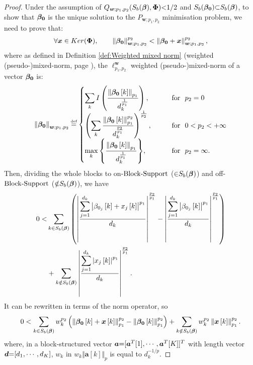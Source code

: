 \begin{proof}
Under the assumption of $Q_{\boldsymbol{w};p_1,p_2}(S_b(\boldsymbol{\beta}),\boldsymbol{\Phi}) {<} 1/2$ and $S_b(\boldsymbol{\beta_0}) {\subset} S_b(\boldsymbol{\beta})$, to show that $\boldsymbol{\beta_0}$ is the unique solution to the $P_{\boldsymbol{w};p_1,p_2}$ minimisation problem, we need to prove that:
\begin{equation*}
\forall \boldsymbol{x} \in Ker(\boldsymbol{\Phi}), \qquad \left\lVert\boldsymbol{\beta_0}\right\rVert_{\boldsymbol{w};p_1,p_2}^{p_2} <
\left\lVert\boldsymbol{\beta_0}+\boldsymbol{x}\right\rVert_{\boldsymbol{w};p_1,p_2}^{p_2},
\end{equation*}
where as defined in Definition \ref{def:Weighted mixed norm} (weighted (pseudo-)mixed-norm, page \pageref{def:Weighted mixed norm}), the $\ell_{p_1,p_2}^{\boldsymbol{w}}$ weighted (pseudo-)mixed-norm of a vector $\boldsymbol{\beta_0}$ is:
 \begin{equation*}
\mynorm{\mybetaz}_{\boldsymbol{w};p_1,p_2} \myeq 
\begin{cases}
    \displaystyle\sum_{k}^{} I \myparanthese{\frac{\mynorm{\mybetaz \mybracket{k}}_{p_1}}{d_k^{\frac{1}{p_1}}}}, & \qquad \text{for \ }p_2= 0\\
    \myparanthese{\displaystyle\sum_{k}^{} \frac{\mynorm{\mybetaz \mybracket{k}}_{p_1}^ {p_2}}{d_k^{\frac{p_2}{p_1}}}} ^ {\frac{1}{p_2}},  & \qquad  \text{for \ } 0 < p_2 < +\infty\\
    \displaystyle\max_{k}{\mybrace{\frac{\mynorm{\mybetaz \mybracket{k}}_{p_1}}{d_k^{\frac{1}{p_1}}}}}, & \qquad \text{for \ } p_2= \infty.
  \end{cases}
\end{equation*}
Then, dividing the whole blocks to on-$\mathrm{Block\text{{-}}Support}$ (${\in} S_b(\boldsymbol{\beta})$) and off-$\mathrm{Block\text{{-}}Support}$ (${\notin} S_b(\boldsymbol{\beta})$), we have
\begin{gather*}
\begin{aligned}
 0 < &\displaystyle\sum_{k \in S_b\left( \boldsymbol{\beta} \right)} \left( \left\lvert\frac{\displaystyle\sum_{j=1}^{d_k} \left\lvert\beta_{0_j}\left[ k \right] + x_{j}\left[ k \right]\right\rvert ^{p_1}}{d_k}\right\rvert ^{\frac{p_2}{p_1}} - 
\left\lvert\frac{\displaystyle\sum_{j=1}^{d_k} \left\lvert\beta_{0_j}\left[ k \right]\right\rvert ^{p_1}}{d_k}\right\rvert ^{\frac{p_2}{p_1}} \right) \\ 
&+ \displaystyle\sum_{k \notin S_b\left( \boldsymbol{\beta} \right)} \left\lvert\frac{\displaystyle\sum_{j=1}^{d_k} \left\lvert x_{j}\left[ k \right]\right\rvert ^{p_1}}{d_k}\right\rvert ^{\frac{p_2}{p_1}}.
\end{aligned}
\end{gather*}
It can be rewritten in terms of the norm operator, so
\begin{gather*}
 0<\displaystyle\sum_{k \in S_b\left( \boldsymbol{\beta} \right)} w_k^{p_2} \left( \left\lVert\boldsymbol{\beta_0}\left[ k \right]+\boldsymbol{x}\left[ k \right]\right\rVert_{p_1}^{p_2} - 
\left\lVert\boldsymbol{\beta_0}\left[ k \right]\right\rVert_{p_1}^{p_2} \right) + 
\displaystyle\sum_{k \notin S_b\left( \boldsymbol{\beta} \right)} w_k^{p_2} \left\lVert\boldsymbol{x}\left[ k \right]\right\rVert_{p_1}^{p_2}.
\end{gather*}
where, in a block-structured vector $\boldsymbol{a} {=} [\boldsymbol{a}^T[1], \cdots,\boldsymbol{a}^T[K]]^T$ with length vector $\boldsymbol{d} {=} [d_1, \cdots, d_K ]$, $w_k$ in $w_k \Vert \boldsymbol{a}[k] \Vert_p$ is equal to $d_k^{-1/p}$.


\end{proof}
